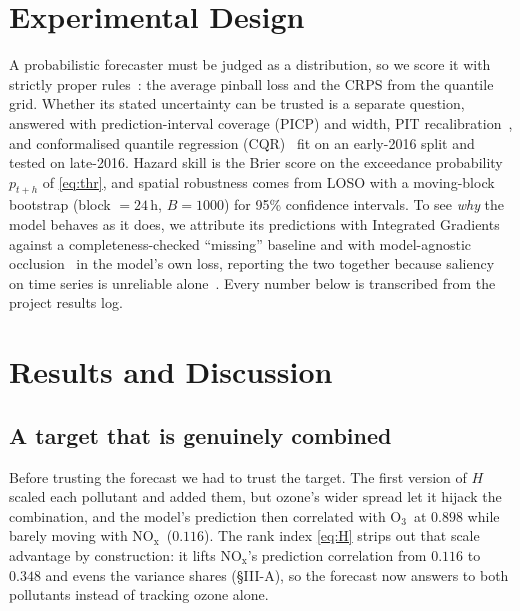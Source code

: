 \documentclass[conference]{IEEEtran}
\newcommand{\nox}{\ensuremath{\mathrm{NO_x}}}
\newcommand{\othree}{\ensuremath{\mathrm{O_3}}}
\begin{document}
\section{Experimental Design}
A probabilistic forecaster must be judged as a distribution, so we score it with strictly proper
rules~\cite{gneiting2007}: the average pinball loss and the CRPS from the quantile grid. Whether its
stated uncertainty can be trusted is a separate question, answered with prediction-interval coverage
(PICP) and width, PIT recalibration~\cite{kuleshov2018}, and conformalised quantile regression
(CQR)~\cite{romano2019} fit on an early-2016 split and tested on late-2016. Hazard skill is the Brier
score on the exceedance probability $p_{t+h}$ of \eqref{eq:thr}, and spatial robustness comes from LOSO
with a moving-block bootstrap (block $=24$\,h, $B=1000$) for 95\% confidence intervals. To see
\emph{why} the model behaves as it does, we attribute its predictions with Integrated
Gradients~\cite{sundararajan2017} against a completeness-checked ``missing'' baseline and with
model-agnostic occlusion~\cite{fisher2019} in the model's own loss, reporting the two together because
saliency on time series is unreliable alone~\cite{ismail2020}. Every number below is transcribed from the
project results log.

\section{Results and Discussion}

\subsection{A target that is genuinely combined}\label{ssec:combined}
Before trusting the forecast we had to trust the target. The first version of $H$ scaled each pollutant
and added them, but ozone's wider spread let it hijack the combination, and the model's prediction then
correlated with \othree\ at $0.898$ while barely moving with \nox\ ($0.116$). The rank index
\eqref{eq:H} strips out that scale advantage by construction: it lifts \nox's prediction correlation
from $0.116$ to $0.348$ and evens the variance shares (\S III-A), so the forecast now answers to both
pollutants instead of tracking ozone alone.
\end{document}
